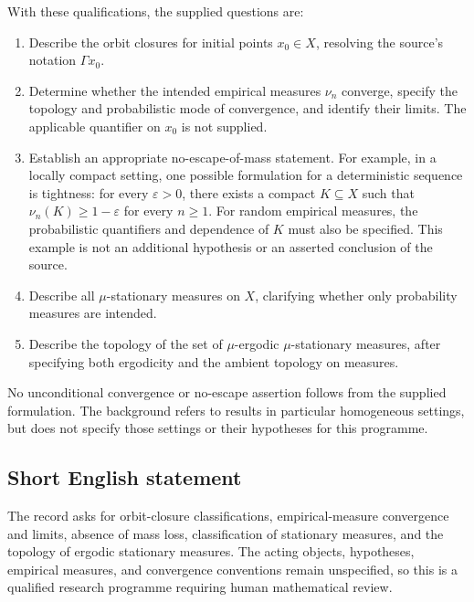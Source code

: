 \documentclass[11pt]{article}
\begin{document}
With these qualifications, the supplied questions are:
\begin{enumerate}
\item Describe the orbit closures for initial points \(x_0\in X\), resolving the source's notation \(\Gamma x_0\).
\item Determine whether the intended empirical measures \(\nu_n\) converge, specify the topology and probabilistic mode of convergence, and identify their limits. The applicable quantifier on \(x_0\) is not supplied.
\item Establish an appropriate no-escape-of-mass statement. For example, in a locally compact setting, one possible formulation for a deterministic sequence is tightness: for every \(\varepsilon>0\), there exists a compact \(K\subseteq X\) such that \(\nu_n(K)\geq1-\varepsilon\) for every \(n\geq1\). For random empirical measures, the probabilistic quantifiers and dependence of \(K\) must also be specified. This example is not an additional hypothesis or an asserted conclusion of the source.
\item Describe all \(\mu\)-stationary measures on \(X\), clarifying whether only probability measures are intended.
\item Describe the topology of the set of \(\mu\)-ergodic \(\mu\)-stationary measures, after specifying both ergodicity and the ambient topology on measures.
\end{enumerate}
No unconditional convergence or no-escape assertion follows from the supplied formulation. The background refers to results in particular homogeneous settings, but does not specify those settings or their hypotheses for this programme.
\subsection{Short English statement}
The record asks for orbit-closure classifications, empirical-measure convergence and limits, absence of mass loss, classification of stationary measures, and the topology of ergodic stationary measures. The acting objects, hypotheses, empirical measures, and convergence conventions remain unspecified, so this is a qualified research programme requiring human mathematical review.
\end{document}
